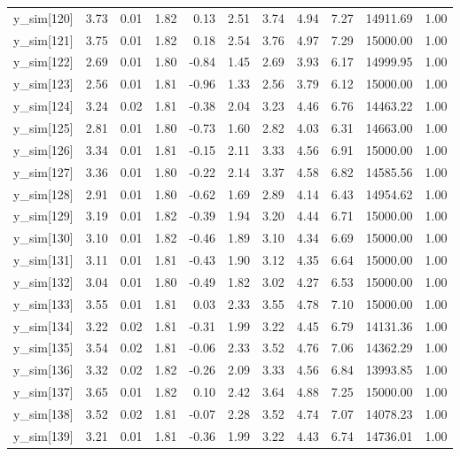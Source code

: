 \begin{table}[ht]
\begin{tabular}{rrrrrrrrrrr}
  y\_sim[120] & 3.73 & 0.01 & 1.82 & 0.13 & 2.51 & 3.74 & 4.94 & 7.27 & 14911.69 & 1.00 \\ 
  y\_sim[121] & 3.75 & 0.01 & 1.82 & 0.18 & 2.54 & 3.76 & 4.97 & 7.29 & 15000.00 & 1.00 \\ 
  y\_sim[122] & 2.69 & 0.01 & 1.80 & -0.84 & 1.45 & 2.69 & 3.93 & 6.17 & 14999.95 & 1.00 \\ 
  y\_sim[123] & 2.56 & 0.01 & 1.81 & -0.96 & 1.33 & 2.56 & 3.79 & 6.12 & 15000.00 & 1.00 \\ 
  y\_sim[124] & 3.24 & 0.02 & 1.81 & -0.38 & 2.04 & 3.23 & 4.46 & 6.76 & 14463.22 & 1.00 \\ 
  y\_sim[125] & 2.81 & 0.01 & 1.80 & -0.73 & 1.60 & 2.82 & 4.03 & 6.31 & 14663.00 & 1.00 \\ 
  y\_sim[126] & 3.34 & 0.01 & 1.81 & -0.15 & 2.11 & 3.33 & 4.56 & 6.91 & 15000.00 & 1.00 \\ 
  y\_sim[127] & 3.36 & 0.01 & 1.80 & -0.22 & 2.14 & 3.37 & 4.58 & 6.82 & 14585.56 & 1.00 \\ 
  y\_sim[128] & 2.91 & 0.01 & 1.80 & -0.62 & 1.69 & 2.89 & 4.14 & 6.43 & 14954.62 & 1.00 \\ 
  y\_sim[129] & 3.19 & 0.01 & 1.82 & -0.39 & 1.94 & 3.20 & 4.44 & 6.71 & 15000.00 & 1.00 \\ 
  y\_sim[130] & 3.10 & 0.01 & 1.82 & -0.46 & 1.89 & 3.10 & 4.34 & 6.69 & 15000.00 & 1.00 \\ 
  y\_sim[131] & 3.11 & 0.01 & 1.81 & -0.43 & 1.90 & 3.12 & 4.35 & 6.64 & 15000.00 & 1.00 \\ 
  y\_sim[132] & 3.04 & 0.01 & 1.80 & -0.49 & 1.82 & 3.02 & 4.27 & 6.53 & 15000.00 & 1.00 \\ 
  y\_sim[133] & 3.55 & 0.01 & 1.81 & 0.03 & 2.33 & 3.55 & 4.78 & 7.10 & 15000.00 & 1.00 \\ 
  y\_sim[134] & 3.22 & 0.02 & 1.81 & -0.31 & 1.99 & 3.22 & 4.45 & 6.79 & 14131.36 & 1.00 \\ 
  y\_sim[135] & 3.54 & 0.02 & 1.81 & -0.06 & 2.33 & 3.52 & 4.76 & 7.06 & 14362.29 & 1.00 \\ 
  y\_sim[136] & 3.32 & 0.02 & 1.82 & -0.26 & 2.09 & 3.33 & 4.56 & 6.84 & 13993.85 & 1.00 \\ 
  y\_sim[137] & 3.65 & 0.01 & 1.82 & 0.10 & 2.42 & 3.64 & 4.88 & 7.25 & 15000.00 & 1.00 \\ 
  y\_sim[138] & 3.52 & 0.02 & 1.81 & -0.07 & 2.28 & 3.52 & 4.74 & 7.07 & 14078.23 & 1.00 \\ 
  y\_sim[139] & 3.21 & 0.01 & 1.81 & -0.36 & 1.99 & 3.22 & 4.43 & 6.74 & 14736.01 & 1.00 \\ 

\end{tabular}
\end{table}
